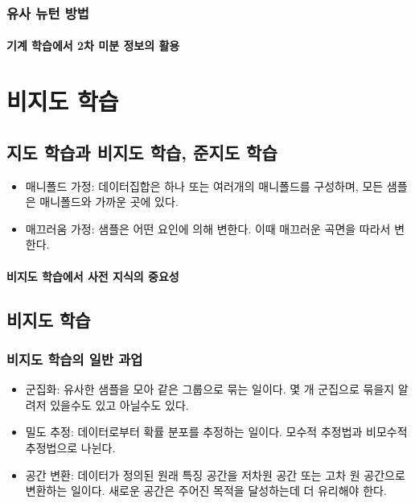 \documentclass [12pt] {oblivoir}
\let\oldsubsubsection=\subsubsection
\renewcommand{\subsubsection}
{
  \filbreak
  \oldsubsubsection
}
\begin{document}
\subsubsection{유사 뉴턴 방법}

\paragraph*{기계 학습에서 2차 미분 정보의 활용}\mbox{}

\vspace{3mm}

\newpage
\section{비지도 학습}

\subsection{지도 학습과 비지도 학습, 준지도 학습}

\begin{itemize}
  \item 매니폴드 가정: 데이터집합은 하나 또는 여러개의 매니폴드를 구성하며, 모든 샘플은 매니폴드와 가까운 곳에 있다.
  \item 매끄러움 가정: 샘플은 어떤 요인에 의해 변한다. 이때 매끄러운 곡면을 따라서 변한다.
\end{itemize}

\paragraph*{비지도 학습에서 사전 지식의 중요성}\mbox{}

\vspace{3mm}

\subsection{비지도 학습}

\subsubsection{비지도 학습의 일반 과업}

\begin{itemize}
  \item 군집화: 유사한 샘플을 모아 같은 그룹으로 묶는 일이다. 몇 개 군집으로 묶을지 알려저 있을수도 있고 아닐수도 있다.
  \item 밀도 추정: 데이터로부터 확률 분포를 추정하는 일이다. 모수적 추정법과 비모수적 추정법으로 나뉜다.
  \item 공간 변환: 데이터가 정의된 원래 특징 공간을 저차원 공간 또는 고차 원 공간으로 변환하는 일이다. 새로운 공간은 주어진 목적을 달성하는데 더 유리해야 한다.
\end{itemize}
\end{document}

